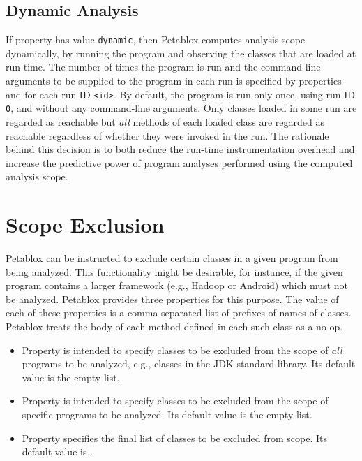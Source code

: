 \subsection{Dynamic Analysis}

If property  has value {\tt dynamic}, then Petablox
computes analysis scope
dynamically, by running the program and observing the
classes that are loaded at run-time.  The number of times the program
is run and the command-line arguments to be supplied to the program in
each run is specified by properties  and
 for each run ID {\tt <id>}.  By default, the
program is run only once, using run ID {\tt 0}, and without any
command-line arguments.  Only classes loaded in some run are regarded
as reachable but {\it all} methods of each loaded class are regarded
as reachable regardless of whether they were invoked in the run.  The
rationale behind this decision is to both reduce the run-time instrumentation
overhead and increase the predictive power of program analyses
performed using the computed analysis scope.

\section{Scope Exclusion}
\label{sec:scope-exclude}

Petablox can be instructed to exclude certain classes in a given program 
from being analyzed.
This functionality might be desirable, for instance, if the given program
contains a larger framework (e.g., Hadoop or Android) which
must not be analyzed.
Petablox provides three properties for this purpose.
The value of each of these properties is a comma-separated list of prefixes
of names of classes.  Petablox treats the body of each method defined in
each such class as a no-op.

\begin{itemize}
\item
Property  is intended to specify
classes to be excluded from the scope of {\it all} programs to be
analyzed, e.g., classes in the JDK standard library.  Its default
value is the empty list.
\item
Property  is intended to specify
classes to be excluded from the scope of specific programs to be
analyzed.  Its default value is the empty list.
\item
Property  specifies the final list of
classes to be excluded from scope.  Its default value is
.
\end{itemize}

